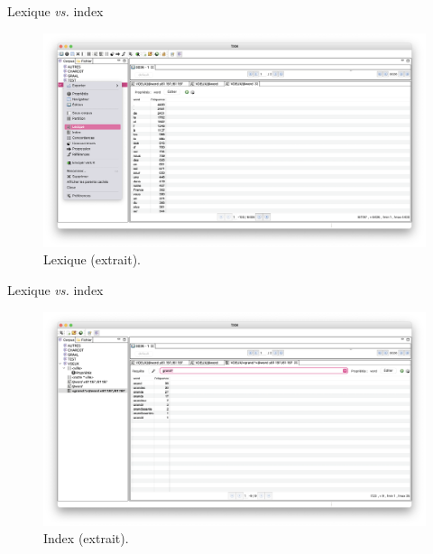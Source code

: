 \documentclass[xetex,xcolor={table,usenames,dvipsnames}]{beamer}
\begin{document}
\begin{frame}{Lexique \textit{vs.} index}
		\begin{figure}[h] %
		\centering
		\includegraphics[width=1\linewidth]{img/lexique.png}
		\caption{Lexique (extrait).}
		\label{fig:ling_out_TAL}
	\end{figure}
\end{frame}

\begin{frame}{Lexique \textit{vs.} index}
	\begin{figure}[h] %
		\centering
		\includegraphics[width=1\linewidth]{img/index.png}
		\caption{Index (extrait).}
		\label{fig:ling_out_TAL}
	\end{figure}
\end{frame}
\end{document}
